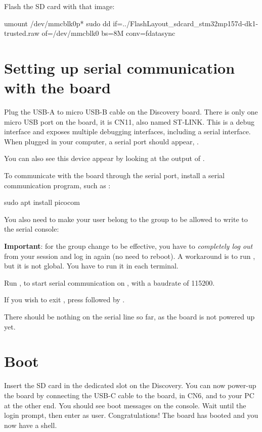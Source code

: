 Flash the SD card with that image:
\begin{bashinput}
umount /dev/mmcblk0p*
sudo dd if=../FlashLayout_sdcard_stm32mp157d-dk1-trusted.raw of=/dev/mmcblk0 bs=8M conv=fdatasync
\end{bashinput}

\section{Setting up serial communication with the board}

Plug the USB-A to micro USB-B cable on the Discovery board. There is
only one micro USB port on the board, it is CN11, also named ST-LINK.
This is a debug interface and exposes multiple debugging interfaces,
including a serial interface. When plugged in your computer, a serial
port should appear, .

You can also see this device appear by looking at the output of
.

To communicate with the board through the serial port, install a
serial communication program, such as :

\begin{bashinput}
sudo apt install picocom
\end{bashinput}

You also need to make your user belong to the  group to be
allowed to write to the serial console:


{\bf Important}: for the group change to be effective, you have to
{\em completely log out} from your session and log in again (no need to
reboot). A workaround is to run , but it is not global.
You have to run it in each terminal.

Run , to start serial
communication on , with a baudrate of 115200.

If you wish to exit , press \code{[Ctrl][a]} followed by
\code{[Ctrl][x]}.

There should be nothing on the serial line so far, as the board is not
powered up yet.

\section{Boot}

Insert the SD card in the dedicated slot on the Discovery.  You can
now power-up the board by connecting the USB-C cable to the board, in
CN6,  and to your PC at the other end.  You should see
boot messages on the console. Wait until the login prompt, then enter
 as user.  Congratulations! The board has booted and you
now have a shell.



